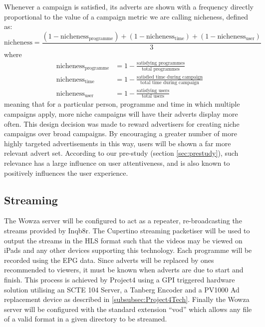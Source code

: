 Whenever a campaign is satisfied, its adverts are shown with a frequency directly proportional to the value of a campaign metric we are calling nicheness, defined as:
$$
	\text{nicheness} = \frac{(1-\text{nicheness}_\text{programme}) + (1-\text{nicheness}_\text{time}) + (1-\text{nicheness}_\text{user})}{3}
$$
where
\begin{align*}
	\text{nicheness}_\text{programme} &= 1 - \frac{\text{satisfying programmes}}{\text{total programmes}} \\
	\text{nicheness}_\text{time} &= 1 - \frac{\text{satisfied time during campaign}}{\text{total time during campaign}} \\
	\text{nicheness}_\text{user} &= 1 - \frac{\text{satisfying users}}{\text{total users}}
\end{align*}
meaning that for a particular person, programme and time in which multiple campaigns apply, more niche campaigns will have their adverts display more often. This design decision was made to reward advertisers for creating niche campaigns over broad campaigns. By encouraging a greater number of more highly targeted advertisements in this way, users will be shown a far more relevant advert set.
According to our pre-study (section \ref{sec:prestudy}), such relevance has a large influence on user attentiveness, and is also known to positively influences the user experience\citep{yahoo-intrusive-advertising}.

\subsection{Streaming}
The Wowza server will be configured to act as a repeater, re-broadcasting the streams provided by Inqb8r. The Cupertino streaming packetiser will be used to output the streams in the HLS format such that the videos may be viewed on iPads and any other devices supporting this technology. Each programme will be recorded using the EPG data. Since adverts will be replaced by ones recommended to viewers, it must be known when adverts are due to start and finish. This process is achieved by Project4 using a GPI\citep{SCTE104} triggered hardware solution utilising an SCTE 104 Server, a Tanberg Encoder and a PV1000 Ad replacement device as described in \ref{subsubsec:Project4Tech}. Finally the Wowza server will be configured with the standard extension ``vod'' which allows any file of a valid format in a given directory to be streamed.

